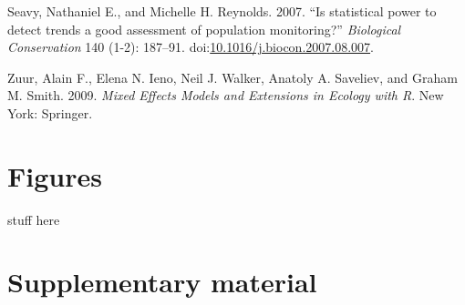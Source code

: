 \documentclass[12pt,]{article}
\begin{document}
\hypertarget{ref-Seavy2007}{}
Seavy, Nathaniel E., and Michelle H. Reynolds. 2007. ``Is statistical
power to detect trends a good assessment of population monitoring?''
\emph{Biological Conservation} 140 (1-2): 187--91.
doi:\href{https://doi.org/10.1016/j.biocon.2007.08.007}{10.1016/j.biocon.2007.08.007}.

\hypertarget{ref-Zuur2009}{}
Zuur, Alain F., Elena N. Ieno, Neil J. Walker, Anatoly A. Saveliev, and
Graham M. Smith. 2009. \emph{Mixed Effects Models and Extensions in
Ecology with R}. New York: Springer.

\section{Figures}\label{figures}

stuff here

\section{Supplementary material}\label{supplementary-material}
\end{document}
